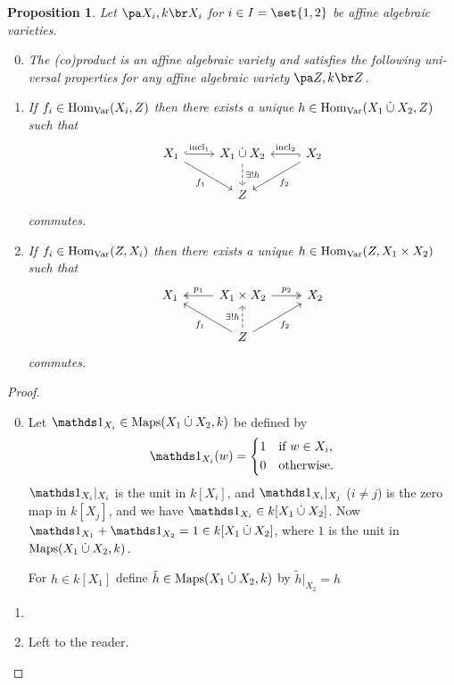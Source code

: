 \documentclass[12pt,a4paper]{scrartcl}
\theoremstyle{cplain}
\theoremstyle{cplain}
\theoremstyle{cplain}
\newtheorem{prop}[thmcounter]{Proposition}
\theoremstyle{definition}
\begin{document}
\begin{otherlanguage}{english}
\begin{prop}
  Let $\aav {X_i}$ for $i\in I=\set{1,2}$ be affine algebraic varieties.
  \begin{enumerate}
    \setcounter{enumi}{-1}
    \item \label{prop:VIII.1:0} The (co)product is an affine algebraic variety and satisfies the following universal properties for any affine algebraic variety $\aav Z$.
    \item \label{prop:VIII.1:1} If $f_i \in \operatorname{Hom}_{\operatorname{Var}}(X_i,Z)$ then there exists a unique $h\in \operatorname{Hom}_{\operatorname{Var}}(X_1\mathbin{\dot{\cup}} X_2, Z)$ such that
    \[\begin{tikzcd}
        X_1 \arrow[hookrightarrow]{r}{\incl_1} \arrow{dr}[swap]{f_1} & X_1 \dotcup X_2 \arrow[dashed]{d}{\exists!h} & X_2 \arrow[hookrightarrow]{l}[swap]{\incl_2} \arrow{dl}{f_2}  \\
        & Z
    \end{tikzcd}\]
  commutes.
  \item \label{prop:VIII.1:2} If $f_i \in \operatorname{Hom}_{\operatorname{Var}}(Z,X_i)$ then there exists a unique $h\in \operatorname{Hom}_{\operatorname{Var}}( Z,X_1\times X_2)$ such that
    \[\begin{tikzcd}
        X_1   & \arrow[twoheadrightarrow]{l}[swap]{p_1} X_1 \times X_2  \arrow[twoheadrightarrow]{r}{p_2}& X_2   \\
        & Z \arrow{ul}{f_1}\arrow{ur}[swap]{f_2} \arrow[dashed]{u}{\exists!h}
    \end{tikzcd}\]
    commutes.
  \end{enumerate}
\end{prop}
\begin{proof}
  \leavevmode
  \begin{enumerate}[label=\ref{prop:VIII.1:\arabic*}]
    \setcounter{enumi}{-1}
    \item Let $\one_{X_i}\in \Maps(X_1 \dotcup X_2 ,k)$ be defined by \[\one_{X_i}(w) = \begin{cases*}1&if $w \in X_i$,\\ 0 & otherwise.\end{cases*}\] $\one_{X_i}|_{X_i}$ is the unit in $k[X_i]$, and $\one_{X_i}|_{X_j}$ ($i\neq j$) is the zero map in $k[X_j]$, and we have $\one_{X_i}\in k[X_1 \dotcup X_2]$. Now $\one_{X_1}+\one_{X_2} = 1 \in k[X_1 \dotcup X_2]$, where $1$ is the unit in $\operatorname{Maps}(X_1 \mathbin{\dot{\cup}} X_2,k)$.

    For $h\in k[X_1]$ define $\tilde h\in \operatorname{Maps}(X_1 \mathbin{\dot{\cup}} X_2 ,k)$ by $\tilde h |_{X_2} = h$ %
    \item 
    \item Left to the reader.
    \qedhere
  \end{enumerate}
\end{proof}


\end{otherlanguage}
\end{document}
